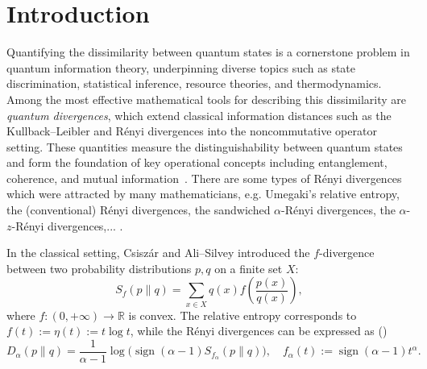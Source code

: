 \documentclass[10pt,reqno]{amsart}
\theoremstyle{break-italic}
\theoremstyle{break-italic}
\theoremstyle{break-italic}
\theoremstyle{break-italic}
\theoremstyle{break-italic}
\theoremstyle{break-italic}
\theoremstyle{break-italic}
\theoremstyle{break-italic}
\theoremstyle{break-roman}
\theoremstyle{standard}
\theoremstyle{varthm-roman}
\theoremstyle{varthm-italic}
\theoremstyle{varthm-roman-break}
\theoremstyle{varthm-italic-break}
\theoremstyle{varthm-roman-no-punctuation}
\theoremstyle{varthm-italic-no-punctuation}
\numberwithin{equation}{section}
\begin{document}
\section{Introduction}
Quantifying the dissimilarity between quantum states is a cornerstone problem in quantum information theory, underpinning diverse topics such as state discrimination, statistical inference, resource theories, and thermodynamics. Among the most effective mathematical tools for describing this dissimilarity are \emph{quantum divergences}, which extend classical information distances such as the Kullback–Leibler and Rényi divergences into the noncommutative operator setting. These quantities measure the distinguishability between quantum states and form the foundation of key operational concepts including entanglement, coherence, and mutual information~\cite{Hiai2017}.  There are some types of R\'enyi divergences which were attracted by many mathematicians, e.g. Umegaki's relative entropy, the (conventional) R\'enyi divergences, the sandwiched $\alpha$-R\'enyi divergences, the $\alpha$-$z$-R\'enyi divergences,... \cite{AD, EH, Hiai2011, Hiai2017, Mu}.  

 
In the classical setting, Csiszár and Ali–Silvey \cite{Cs} introduced the $f$-divergence between two probability distributions $p,q$ on a finite set $X$:
\begin{equation}
S_f(p\|q) = \sum_{x \in X} q(x) f\!\left( \frac{p(x)}{q(x)} \right),
\end{equation}
where $f:(0,+\infty)\to\mathbb{R}$ is convex. The relative entropy corresponds to \( f(t) := \eta(t) := t \log t \), while the R\'enyi divergences can be expressed as (\cite{Hiai2017})
$$
D_{\alpha}(p\|q) = \frac{1}{\alpha - 1} \log \bigl( \operatorname{sign}(\alpha - 1) S_{f_{\alpha}}(p\|q) \bigr), \quad
f_{\alpha}(t) := \operatorname{sign}(\alpha - 1)t^{\alpha}.
$$ 
\end{document}

